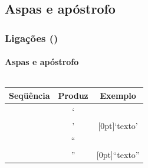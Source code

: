 \documentclass[handout,10pt]{beamer}
\begin{document}
\subsection{Aspas e apóstrofo}
\begin{frame}[fragile]
	\frametitle{Ligações ()}
	\framesubtitle{Aspas e apóstrofo}
	
	\centering
	
	\begin{columns}
		
			\centering
			\begin{tabular}{ccc}
				\toprule
				Seqüência & Produz & Exemplo \\
				\midrule		
				\crase & ` & \\
				\aspas & ' & \raisebox{1.5ex}[0pt]{`texto'}\\
				\cmidrule{1-3}
				\crase\crase & `` & \\	
				\aspas\aspas & '' & \raisebox{1.5ex}[0pt]{``texto''}\\		
				\bottomrule			
			\end{tabular}


\end{columns}
\end{frame}
\end{document}
